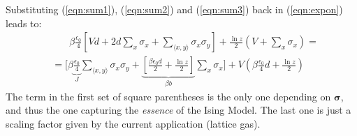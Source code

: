 \documentclass[../template.tex]{subfiles}
\begin{document}
\medskip

Substituting (\ref{eqn:sum1}), (\ref{eqn:sum2}) and (\ref{eqn:sum3}) back in (\ref{eqn:expon}) leads to:
\begin{align}\nonumber
    &\phantom{=\>\>}\beta \frac{\epsilon_0}{4} \left[Vd + 2d \sum_x \sigma_x + \sum_{\langle x,y \rangle} \sigma_x \sigma_y\right]  + \frac{\ln z}{2} \left(V + \sum_x \sigma_x\right) =\\ \label{eqn:exponen2}
    &=\Bigg[\beta \underbrace{\frac{\epsilon_0}{4}}_{J} \sum_{\langle x,y \rangle} \sigma_x \sigma_y + \underbrace{\left[\frac{\beta \epsilon_0 d}{2}  + \frac{\ln z}{2} \right]}_{\beta b}  \sum_x \sigma_x \Bigg] + V\left( \beta \frac{\epsilon_0}{4} d +\frac{\ln z}{2} \right)
\end{align}
The term in the first set of square parentheses is the only one depending on $\bm{\sigma}$, and thus the one capturing the \textit{essence} of the Ising Model. The last one is just a scaling factor given by the current application (lattice gas).

\medskip
\end{document}
